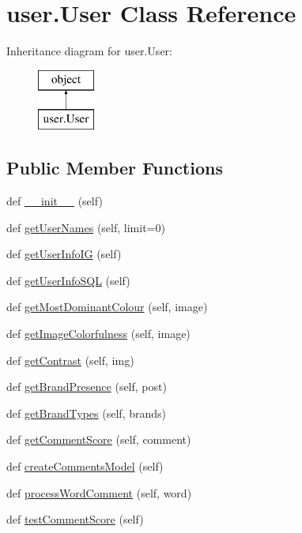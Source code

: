 \hypertarget{classuser_1_1_user}{}\section{user.\+User Class Reference}
\label{classuser_1_1_user}
Inheritance diagram for user.\+User\+:\begin{figure}[H]
\begin{center}
\leavevmode
\includegraphics[height=2.000000cm]{classuser_1_1_user}
\end{center}
\end{figure}
\subsection*{Public Member Functions}
\begin{DoxyCompactItemize}
\item 
def \mbox{\hyperlink{classuser_1_1_user_a25681f18d7857cac8117612e68c92cc5}{\+\_\+\+\_\+init\+\_\+\+\_\+}} (self)
\item 
def \mbox{\hyperlink{classuser_1_1_user_a09bf41f6ea57ec2ce77fa616738d08bc}{get\+User\+Names}} (self, limit=0)
\item 
def \mbox{\hyperlink{classuser_1_1_user_a7dfe5ca7988fd34b0c801742a5aa84e6}{get\+User\+Info\+IG}} (self)
\item 
def \mbox{\hyperlink{classuser_1_1_user_a5b18648f492550fba80fd13478888d1d}{get\+User\+Info\+S\+QL}} (self)
\item 
def \mbox{\hyperlink{classuser_1_1_user_a8fb05076e464cc8df275207908fd30bc}{get\+Most\+Dominant\+Colour}} (self, image)
\item 
def \mbox{\hyperlink{classuser_1_1_user_a1876aea4aa2e915ff8e933910f2df6e4}{get\+Image\+Colorfulness}} (self, image)
\item 
def \mbox{\hyperlink{classuser_1_1_user_ab013b6d1535fe2b752a8eb5649018a1c}{get\+Contrast}} (self, img)
\item 
def \mbox{\hyperlink{classuser_1_1_user_a5269972e3c641c50202185b171fe904b}{get\+Brand\+Presence}} (self, post)
\item 
def \mbox{\hyperlink{classuser_1_1_user_a3fd64901698b59210a03be44ff5123e8}{get\+Brand\+Types}} (self, brands)
\item 
def \mbox{\hyperlink{classuser_1_1_user_ae21bbe88ed8f0421aba11b51df3fc03f}{get\+Comment\+Score}} (self, comment)
\item 
def \mbox{\hyperlink{classuser_1_1_user_a817542763611c0dd2d4ae4efc997f079}{create\+Comments\+Model}} (self)
\item 
def \mbox{\hyperlink{classuser_1_1_user_a91c0417fe409dae061a9acc84222e124}{process\+Word\+Comment}} (self, word)
\item 
def \mbox{\hyperlink{classuser_1_1_user_a2bf236a7cfb42cb97298c49d29330e69}{test\+Comment\+Score}} (self)
\end{DoxyCompactItemize}

